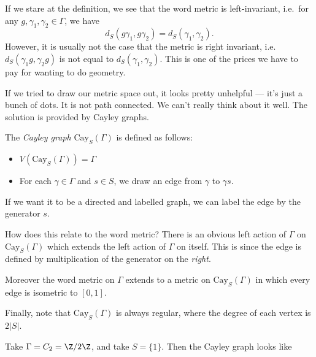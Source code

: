 \documentclass[a4paper]{article}
\newcommand\Cay{\mathrm{Cay}}
\begin{document}
If we stare at the definition, we see that the word metric is left-invariant, i.e.\ for any $g, \gamma_1, \gamma_2 \in \Gamma$, we have
\[
  d_S(g \gamma_1, g \gamma_2) = d_S(\gamma_1, \gamma_2).
  \]
However, it is usually not the case that the metric is right invariant, i.e.\ $d_S(\gamma_1 g, \gamma_2 g)$ is not equal to $d_S(\gamma_1, \gamma_2)$. This is one of the prices we have to pay for wanting to do geometry.

If we tried to draw our metric space out, it looks pretty unhelpful --- it's just a bunch of dots. It is not path connected. We can't really think about it well. The solution is provided by Cayley graphs.

\begin{defi}
  The \emph{Cayley graph} $\Cay_S(\Gamma)$ is defined as follows:
  \begin{itemize}
    \item $V(\Cay_S(\Gamma)) = \Gamma$
    \item For each $\gamma \in \Gamma$ and $s \in S$, we draw an edge from $\gamma$ to $\gamma s$.
  \end{itemize}
\end{defi}
If we want it to be a directed and labelled graph, we can label the edge by the generator $s$.

How does this relate to the word metric? There is an obvious left action of $\Gamma$ on $\Cay_S(\Gamma)$ which extends the left action of $\Gamma$ on itself. This is since the edge is defined by multiplication of the generator on the \emph{right}.

Moreover the word metric on $\Gamma$ extends to a metric on $\Cay_S(\Gamma)$ in which every edge is isometric to $[0, 1]$.

Finally, note that $\Cay_S(\Gamma)$ is always regular, where the degree of each vertex is $2|S|$.

\begin{eg}
  Take $\Gamma = C_2 = \Z/2\Z$, and take $S = \{1\}$. Then the Cayley graph looks like
  \begin{center}
  \end{center}
\end{eg}
\end{document}
